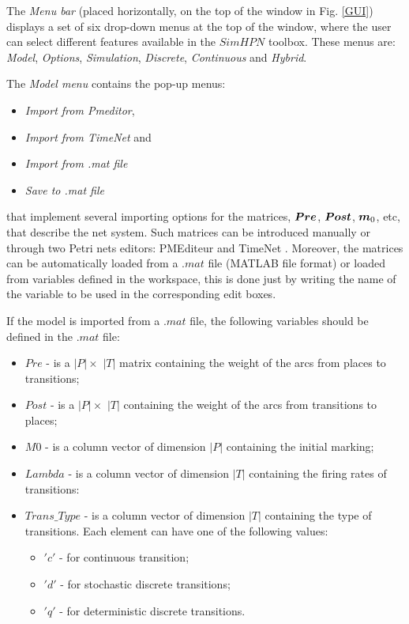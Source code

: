The \emph{Menu bar} (placed horizontally, on the top of the window in Fig. \ref{GUI}) displays a set of six drop-down menus at the top of the window, where the user can select different features available in the $SimHPN$ toolbox. These menus are: \emph{Model}, \emph{Options}, \emph{Simulation}, \emph{Discrete}, \emph{Continuous} and \emph{Hybrid}.

The {\color{blue}\emph{Model menu}} contains the pop-up menus:
\begin{itemize}
\item \emph{Import from Pmeditor}, 
\item \emph{Import from TimeNet} and 
\item \emph{Import from .mat file} 
\item \emph{Save to .mat file}
\end{itemize}
that implement several importing options for the matrices, $\b{Pre}$, $\b{Post}$, $\mo$, etc, that describe the net system. Such matrices can be introduced manually or through two Petri nets editors: PMEditeur and TimeNet \cite{IPZiKn95}.  Moreover, the matrices can be automatically loaded from a $.mat$ file (MATLAB file format) or loaded from variables defined in the workspace, this is done just by writing the name of the variable to be used in the corresponding edit boxes. 

If the model is imported from a $.mat$ file, the following variables should be defined in the $.mat$ file:

\begin{itemize}
\item $Pre$ - is a $|P| \times$ $|T|$ matrix containing the weight of the arcs from places to transitions;
\item $Post$ - is a $|P| \times$ $|T|$   containing the weight of the arcs from transitions to places;
\item $M0$ - is a column vector of dimension $|P|$ containing the initial marking;
\item $Lambda$ - is a column vector of dimension $|T|$ containing the firing rates of transitions:
\item $Trans\_Type$ - is a column vector of dimension $|T|$ containing the type of transitions. Each element can have one of the following values:
\begin{itemize}
\item $'c'$ - for continuous transition;
\item $'d'$ - for stochastic discrete transitions;
\item $'q'$ -  for deterministic  discrete transitions.
\end{itemize}
\end{itemize}


